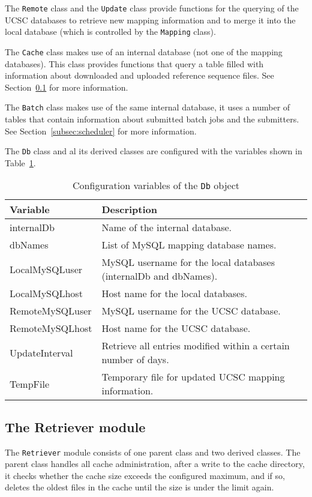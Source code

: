 \documentclass{article}
\begin{document}
The \texttt{Remote} class and the \texttt{Update} class provide functions for
the querying of the UCSC databases to retrieve new mapping information and to
merge it into the local database (which is controlled by the \texttt{Mapping}
class).

The \texttt{Cache} class makes use of an internal database (not one of the
mapping databases). This class provides functions that query a table filled
with information about downloaded and uploaded reference sequence files. See
Section~\ref{subsec:retriever} for more information.

The \texttt{Batch} class makes use of the same internal database, it uses a
number of tables that contain information about submitted batch jobs and the
submitters. See Section~\ref{subsec:scheduler} for more information.

The \texttt{Db} class and al its derived classes are configured with the
variables shown in Table~\ref{tab:dbconfig}.

\begin{table}[H]
\begin{center}
\begin{tabular}{l|p{8cm}}
Variable        & Description \\
\hline
internalDb      & Name of the internal database. \\
dbNames         & List of MySQL mapping database names. \\
LocalMySQLuser  & MySQL username for the local databases (internalDb and 
                  dbNames). \\
LocalMySQLhost  & Host name for the local databases. \\
RemoteMySQLuser & MySQL username for the UCSC database. \\
RemoteMySQLhost & Host name for the UCSC database. \\
UpdateInterval  & Retrieve all entries modified within a certain number of 
                  days. \\
TempFile        & Temporary file for updated UCSC mapping information.
\end{tabular}
\caption{Configuration variables of the \texttt{Db} object} 
\label{tab:dbconfig}
\end{center}
\end{table}

\subsection{The Retriever module} \label{subsec:retriever}
The \texttt{Retriever} module consists of one parent class and two derived
classes. The parent class handles all cache administration, after a write to
the cache directory, it checks whether the cache size exceeds the configured
maximum, and if so, deletes the oldest files in the cache until the size is
under the limit again.
\end{document}
